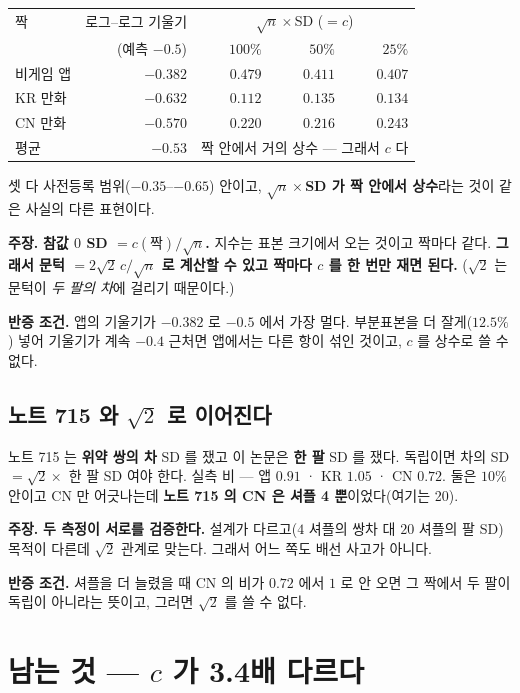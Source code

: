 \documentclass[10pt,a4paper]{article}
\newcommand{\claim}[2]{\begin{claimbox}\textbf{주장.} #1\par\smallskip
  \textcolor{gray!70}{\textbf{반증 조건.} #2}\end{claimbox}}
\begin{document}
\begin{center}
\begin{tabular}{lrrrr}
\toprule
짝 & 로그--로그 기울기 & \multicolumn{3}{c}{$\sqrt{n}\times$SD ($=c$)} \\
 & (예측 $-0.5$) & $100\%$ & $50\%$ & $25\%$ \\
\midrule
비게임 앱 & $\mathbf{-0.382}$ & $0.479$ & $0.411$ & $0.407$ \\
KR 만화 & $\mathbf{-0.632}$ & $0.112$ & $0.135$ & $0.134$ \\
CN 만화 & $\mathbf{-0.570}$ & $0.220$ & $0.216$ & $0.243$ \\
\midrule
평균 & $-0.53$ & \multicolumn{3}{l}{짝 안에서 거의 상수 --- 그래서 $c$ 다} \\
\bottomrule
\end{tabular}
\end{center}

셋 다 사전등록 범위($-0.35$--$-0.65$) 안이고, \textbf{$\sqrt{n}\times$SD 가 짝 안에서
상수}라는 것이 같은 사실의 다른 표현이다.

\claim{\textbf{참값 $0$ SD $= c(\text{짝})/\sqrt{n}$.} 지수는 표본 크기에서 오는
것이고 짝마다 같다. \textbf{그래서 문턱 $= 2\sqrt{2}\,c/\sqrt{n}$ 로 계산할 수 있고
짝마다 $c$ 를 한 번만 재면 된다.} ($\sqrt{2}$ 는 문턱이 \emph{두 팔의 차}에 걸리기
때문이다.)}
{앱의 기울기가 $-0.382$ 로 $-0.5$ 에서 가장 멀다. 부분표본을 더 잘게($12.5\%$) 넣어
기울기가 계속 $-0.4$ 근처면 앱에서는 다른 항이 섞인 것이고, $c$ 를 상수로 쓸 수
없다.}

\subsection*{노트 715 와 $\sqrt{2}$ 로 이어진다}

노트 715 는 \textbf{위약 쌍의 차} SD 를 쟀고 이 논문은 \textbf{한 팔} SD 를 쟀다.
독립이면 차의 SD $=\sqrt{2}\times$ 한 팔 SD 여야 한다. 실측 비 --- 앱 $0.91$ ·
KR $1.05$ · CN $0.72$. 둘은 $10\%$ 안이고 CN 만 어긋나는데 \textbf{노트 715 의 CN
은 셔플 4 뿐}이었다(여기는 20).

\claim{\textbf{두 측정이 서로를 검증한다.} 설계가 다르고($4$ 셔플의 쌍차 대 $20$
셔플의 팔 SD) 목적이 다른데 $\sqrt{2}$ 관계로 맞는다. 그래서 어느 쪽도 배선 사고가
아니다.}
{셔플을 더 늘렸을 때 CN 의 비가 $0.72$ 에서 $1$ 로 안 오면 그 짝에서 두 팔이 독립이
아니라는 뜻이고, 그러면 $\sqrt{2}$ 를 쓸 수 없다.}

\section{남는 것 --- $c$ 가 3.4배 다르다}
\end{document}
